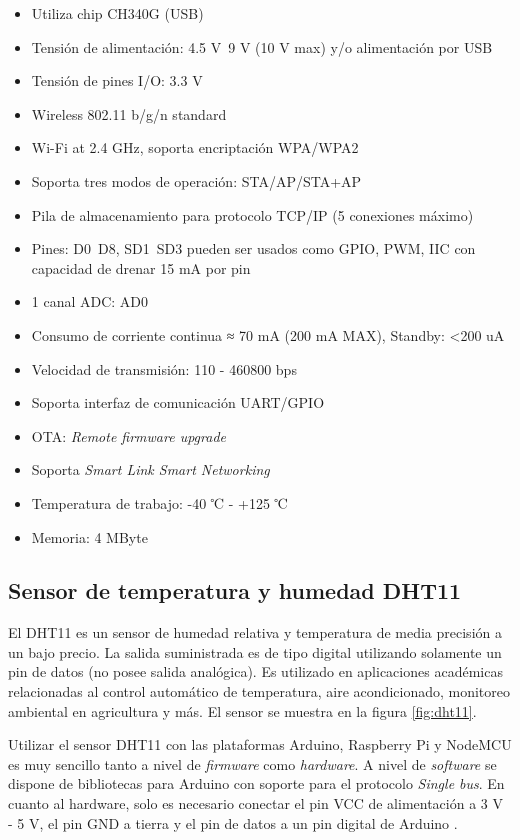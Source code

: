 \begin{itemize}
\item Utiliza chip CH340G (USB)
\item Tensión de alimentación: 4.5 V~9 V (10 V max) y/o alimentación por USB
\item Tensión de pines I/O: 3.3 V
\item Wireless 802.11 b/g/n standard
\item Wi-Fi at 2.4 GHz, soporta encriptación WPA/WPA2
\item Soporta tres modos de operación: STA/AP/STA+AP
\item Pila de almacenamiento para protocolo TCP/IP (5 conexiones máximo)
\item Pines: D0~D8, SD1~SD3 pueden ser usados como GPIO, PWM, IIC con capacidad de drenar 15 mA por pin
\item 1 canal ADC: AD0
\item Consumo de corriente continua ≈ 70 mA (200 mA MAX), Standby: <200 uA
\item Velocidad de transmisión: 110 - 460800 bps
\item Soporta interfaz de comunicación UART/GPIO
\item OTA: \emph{Remote firmware upgrade}
\item Soporta \emph{Smart Link Smart Networking}
\item Temperatura de trabajo: -40 ℃ - +125 ℃
\item Memoria: 4 MByte
\end{itemize}

\subsection{Sensor de temperatura y humedad DHT11}

El DHT11 es un sensor de humedad relativa y temperatura de media precisión a un bajo precio. La salida suministrada es de tipo digital utilizando solamente un pin de datos (no posee salida analógica). Es utilizado en aplicaciones académicas relacionadas al control automático de temperatura, aire acondicionado, monitoreo ambiental en agricultura y más. El sensor se muestra en la figura \ref{fig:dht11}.

Utilizar el sensor DHT11 con las plataformas Arduino, Raspberry Pi y NodeMCU es muy sencillo tanto a nivel de \emph{firmware} como \emph{hardware}. A nivel de \emph{software} se dispone de bibliotecas para Arduino con soporte para el protocolo \emph{Single bus}. En cuanto al hardware, solo es necesario conectar el pin VCC de alimentación a 3 V - 5 V, el pin GND a tierra y el pin de datos a un pin digital de Arduino \citep{WEBSITE:8}. 

